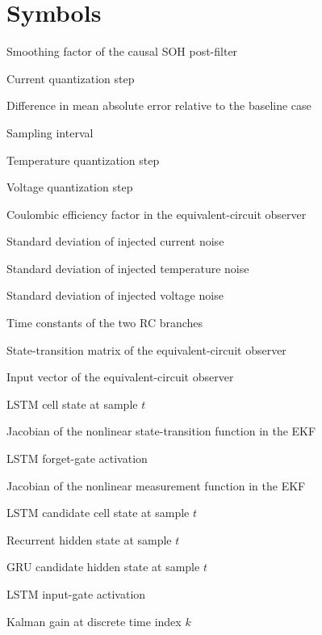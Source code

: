 \documentclass[
    a4paper,
    12pt,
    titlepage,
    bibliography=totoc,
    twoside=on,
    parskip=false,
    numbers=noenddot,
    cleardoublepage=empty,
    DIV=12,
    BCOR=12.0mm,
    headheight=36pt,
    headings=openright
]{scrreprt}
\begin{document}
\chapter*{Symbols}
\begin{description}[style=nextline,leftmargin=3.2cm]
\item[$\alpha$] Smoothing factor of the causal SOH post-filter
\item[$\Delta I$] Current quantization step
\item[$\Delta\mathrm{MAE}$] Difference in mean absolute error relative to the baseline case
\item[$\Delta t$] Sampling interval
\item[$\Delta T$] Temperature quantization step
\item[$\Delta U$] Voltage quantization step
\item[$\eta$] Coulombic efficiency factor in the equivalent-circuit observer
\item[$\sigma_I$] Standard deviation of injected current noise
\item[$\sigma_T$] Standard deviation of injected temperature noise
\item[$\sigma_U$] Standard deviation of injected voltage noise
\item[$\tau_1,\tau_2$] Time constants of the two RC branches
\item[$\mathbf{A}$] State-transition matrix of the equivalent-circuit observer
\item[$\mathbf{b}$] Input vector of the equivalent-circuit observer
\item[$\mathbf{c}_t$] LSTM cell state at sample $t$
\item[$\mathbf{F}_k$] Jacobian of the nonlinear state-transition function in the EKF
\item[$\mathbf{f}_t$] LSTM forget-gate activation
\item[$\mathbf{H}_k$] Jacobian of the nonlinear measurement function in the EKF
\item[$\tilde{\mathbf{c}}_t$] LSTM candidate cell state at sample $t$
\item[$\mathbf{h}_t$] Recurrent hidden state at sample $t$
\item[$\tilde{\mathbf{h}}_t$] GRU candidate hidden state at sample $t$
\item[$\mathbf{i}_t$] LSTM input-gate activation
\item[$\mathbf{K}_k$] Kalman gain at discrete time index $k$

\end{description}
\end{document}
